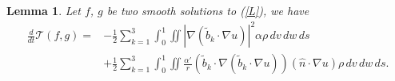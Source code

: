 \documentclass[11pt]{amsart}
\numberwithin{equation}{section}
\newtheorem{lemma}{Lemma}
\begin{document}

\begin{lemma}\label{deriv_Wass2_eps=0}
Let $f$, $g$ be two smooth solutions to (\ref{L}), we have 
\begin{align*}%
  \frac{d}{dt}\mathcal T (f,g)  
  = &	-\frac{1}{2}\sum_{k=1}^{3}\int_{0}^{1}\iint\left|\nabla\left(\tilde{b}_{k}\cdot\nabla u\right)\right|^{2}\alpha\rho\,dv\,dw\,ds\\
  & +\frac{1}{2}\sum_{k=1}^{3} \int_0^1\iint\frac{\alpha'}{r}\left(\tilde{b}_{k}\cdot\nabla\left(\tilde{b}_{k}\cdot\nabla u\right)\right)\left(\hat{n}\cdot\nabla u\right)\rho\,dv\,dw\,ds.
  \nonumber
\end{align*}
\end{lemma}
\end{document}
